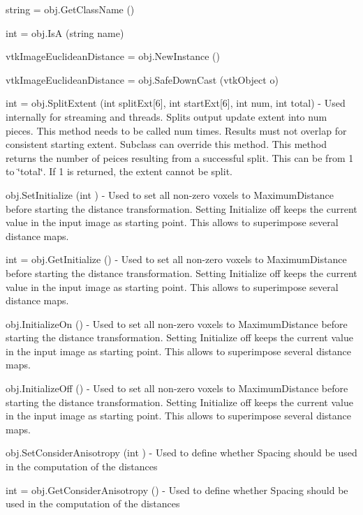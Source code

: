 \begin{DoxyItemize}
\item {\ttfamily string = obj.\-Get\-Class\-Name ()}  
\item {\ttfamily int = obj.\-Is\-A (string name)}  
\item {\ttfamily vtk\-Image\-Euclidean\-Distance = obj.\-New\-Instance ()}  
\item {\ttfamily vtk\-Image\-Euclidean\-Distance = obj.\-Safe\-Down\-Cast (vtk\-Object o)}  
\item {\ttfamily int = obj.\-Split\-Extent (int split\-Ext\mbox{[}6\mbox{]}, int start\-Ext\mbox{[}6\mbox{]}, int num, int total)} -\/ Used internally for streaming and threads. Splits output update extent into num pieces. This method needs to be called num times. Results must not overlap for consistent starting extent. Subclass can override this method. This method returns the number of peices resulting from a successful split. This can be from 1 to \char`\"{}total\char`\"{}. If 1 is returned, the extent cannot be split.  
\item {\ttfamily obj.\-Set\-Initialize (int )} -\/ Used to set all non-\/zero voxels to Maximum\-Distance before starting the distance transformation. Setting Initialize off keeps the current value in the input image as starting point. This allows to superimpose several distance maps.  
\item {\ttfamily int = obj.\-Get\-Initialize ()} -\/ Used to set all non-\/zero voxels to Maximum\-Distance before starting the distance transformation. Setting Initialize off keeps the current value in the input image as starting point. This allows to superimpose several distance maps.  
\item {\ttfamily obj.\-Initialize\-On ()} -\/ Used to set all non-\/zero voxels to Maximum\-Distance before starting the distance transformation. Setting Initialize off keeps the current value in the input image as starting point. This allows to superimpose several distance maps.  
\item {\ttfamily obj.\-Initialize\-Off ()} -\/ Used to set all non-\/zero voxels to Maximum\-Distance before starting the distance transformation. Setting Initialize off keeps the current value in the input image as starting point. This allows to superimpose several distance maps.  
\item {\ttfamily obj.\-Set\-Consider\-Anisotropy (int )} -\/ Used to define whether Spacing should be used in the computation of the distances  
\item {\ttfamily int = obj.\-Get\-Consider\-Anisotropy ()} -\/ Used to define whether Spacing should be used in the computation of the distances  

\end{DoxyItemize}
